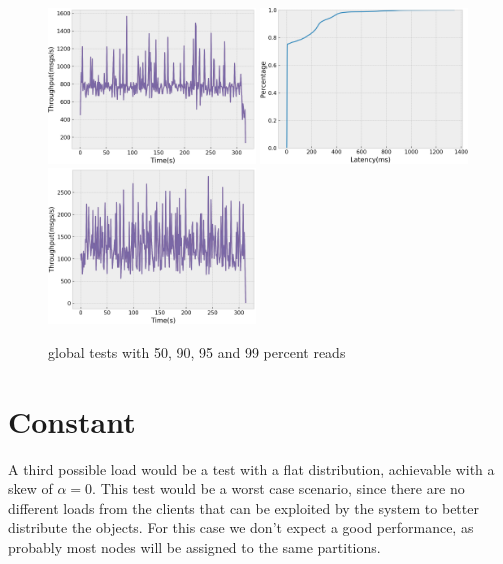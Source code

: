 \begin{figure}[H]
  \includegraphics[width=0.49\textwidth,height=\textheight,keepaspectratio]{img/global5_tp.png}
  \includegraphics[width=0.49\textwidth,height=\textheight,keepaspectratio]{img/global1_lat.png}
  \includegraphics[width=0.49\textwidth,height=\textheight,keepaspectratio]{img/global1_tp.png}
  \caption{ global tests with 50, 90, 95 and 99 percent reads }
  \label{fig:global50-performance}
\end{figure}

\section{Constant}\label{sec:constant}
A third possible load would be a test with a flat distribution, achievable with a skew of $\alpha = 0$. This test would be a worst case scenario, since there are no different loads from the clients that can be exploited by the system to better distribute the objects. For this case we don't expect a good performance, as probably most nodes will be assigned to the same partitions.

